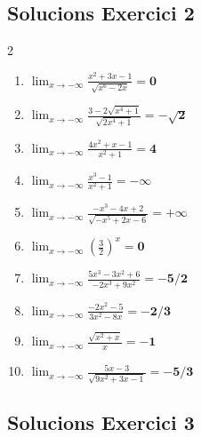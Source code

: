 \documentclass[12pt,a4paper]{article}
\begin{document}
\subsection*{Solucions Exercici 2}
\begin{multicols}{2}
\begin{enumerate}[label=2.\arabic*]
    \item $\displaystyle \lim_{x \to -\infty} \frac{x^2+3x-1}{\sqrt{x^6-2x}} = \mathbf{0}$
    \item $\displaystyle \lim_{x \to -\infty} \frac{3-2\sqrt{x^4+1}}{\sqrt{2x^4+1}} = \mathbf{-\sqrt{2}}$
    \item $\displaystyle \lim_{x \to -\infty} \frac{4x^2+x-1}{x^2+1} = \mathbf{4}$
    \item $\displaystyle \lim_{x \to -\infty} \frac{x^3-1}{x^2+1} = \mathbf{-\infty}$
    \item $\displaystyle \lim_{x \to -\infty} \frac{-x^3-4x+2}{\sqrt{-x^5+2x-6}} = \mathbf{+\infty}$
    \item $\displaystyle \lim_{x \to -\infty} \left( \frac{3}{2} \right)^{\!x} = \mathbf{0}$
    \item $\displaystyle \lim_{x \to -\infty} \frac{5x^3-3x^2+6}{-2x^3+9x^2} = \mathbf{-5/2}$
    \item $\displaystyle \lim_{x \to -\infty} \frac{-2x^2-5}{3x^2-8x} = \mathbf{-2/3}$
    \item $\displaystyle \lim_{x \to -\infty} \frac{\sqrt{x^2+x}}{x} = \mathbf{-1}$
    \item $\displaystyle \lim_{x \to -\infty} \frac{5x-3}{\sqrt{9x^2+3x-1}} = \mathbf{-5/3}$
\end{enumerate}
\end{multicols}

\subsection*{Solucions Exercici 3}
\end{document}
